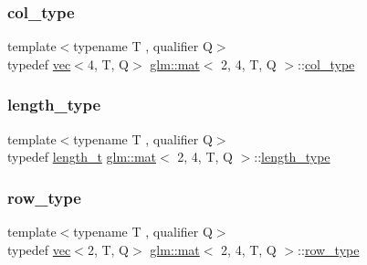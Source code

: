 \subsubsection{\texorpdfstring{col\+\_\+type}{col\_type}}
{\footnotesize\ttfamily template$<$typename T , qualifier Q$>$ \\
typedef \mbox{\hyperlink{structglm_1_1vec}{vec}}$<$4, T, Q$>$ \mbox{\hyperlink{structglm_1_1mat}{glm\+::mat}}$<$ 2, 4, T, Q $>$\+::\mbox{\hyperlink{structglm_1_1mat_3_012_00_014_00_01_t_00_01_q_01_4_ae14ad10a9d8ce3908ec89ae373a27872}{col\+\_\+type}}}

\mbox{\label{structglm_1_1mat_3_012_00_014_00_01_t_00_01_q_01_4_a5295c484627e965d615f3367c2ca45d8}} 
\subsubsection{\texorpdfstring{length\+\_\+type}{length\_type}}
{\footnotesize\ttfamily template$<$typename T , qualifier Q$>$ \\
typedef \mbox{\hyperlink{namespaceglm_a090a0de2260835bee80e71a702492ed9}{length\+\_\+t}} \mbox{\hyperlink{structglm_1_1mat}{glm\+::mat}}$<$ 2, 4, T, Q $>$\+::\mbox{\hyperlink{structglm_1_1mat_3_012_00_014_00_01_t_00_01_q_01_4_a5295c484627e965d615f3367c2ca45d8}{length\+\_\+type}}}

\mbox{\label{structglm_1_1mat_3_012_00_014_00_01_t_00_01_q_01_4_af7681d37f1454b1e18754262a65eb6d1}} 
\subsubsection{\texorpdfstring{row\+\_\+type}{row\_type}}
{\footnotesize\ttfamily template$<$typename T , qualifier Q$>$ \\
typedef \mbox{\hyperlink{structglm_1_1vec}{vec}}$<$2, T, Q$>$ \mbox{\hyperlink{structglm_1_1mat}{glm\+::mat}}$<$ 2, 4, T, Q $>$\+::\mbox{\hyperlink{structglm_1_1mat_3_012_00_014_00_01_t_00_01_q_01_4_af7681d37f1454b1e18754262a65eb6d1}{row\+\_\+type}}}

